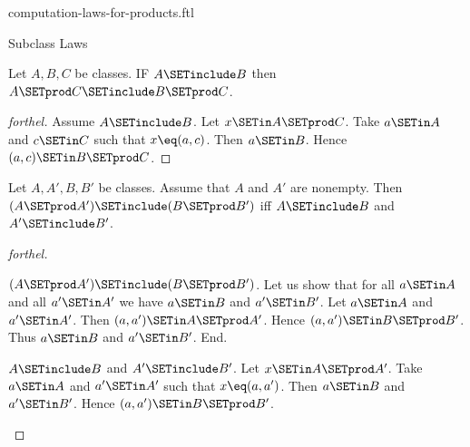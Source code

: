 \documentclass{stex}
\begin{document}
\begin{smodule}{computation-laws-for-products.ftl}

\begin{sfragment}{Subclass Laws}
  \begin{proposition}[forthel,id=FOUNDATIONS_05_5719644021194752]
    Let $A, B, C$ be classes.
    IF $A \SETinclude B$ then $A \SETprod C \SETinclude B \SETprod C$.
  \end{proposition}
  \begin{proof}[forthel]
    Assume $A \SETinclude B$.
    Let $x \SETin A \SETprod C$.
    Take $a \SETin A$ and $c \SETin C$ such that $x \eq (a, c)$.
    Then $a \SETin B$.
    Hence $(a, c) \SETin B \SETprod C$.
  \end{proof}

  \begin{proposition}[forthel,id=FOUNDATIONS_05_4888282951319552]
    Let $A, A', B, B'$ be classes.
    Assume that $A$ and $A'$ are nonempty.
    Then $(A \SETprod A') \SETinclude (B \SETprod B')$ iff $A \SETinclude B$ and $A' \SETinclude B'$.
  \end{proposition}
  \begin{proof}[forthel]
    \begin{case}{$(A \SETprod A') \SETinclude (B \SETprod B')$.}
      Let us show that for all $a \SETin A$ and all $a' \SETin A'$ we have $a \SETin B$ and $a' \SETin B'$.
        Let $a \SETin A$ and $a' \SETin A'$.
        Then $(a, a') \SETin A \SETprod A'$.
        Hence $(a, a') \SETin B \SETprod B'$.
        Thus $a \SETin B$ and $a' \SETin B'$.
      End.
    \end{case}

    \begin{case}{$A \SETinclude B$ and $A' \SETinclude B'$.}
      Let $x \SETin A \SETprod A'$.
      Take $a \SETin A$ and $a' \SETin A'$ such that $x \eq (a, a')$.
      Then $a \SETin B$ and $a' \SETin B'$.
      Hence $(a, a') \SETin B \SETprod B'$.
    \end{case}
  \end{proof}
\end{sfragment}


\end{smodule}
\end{document}
